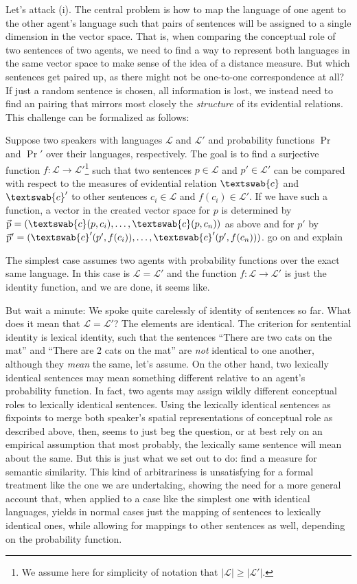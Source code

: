 \documentclass[11pt, a4paper]{scrartcl}
\renewcommand{\i}[1]{\emph{#1}}
\renewcommand{\L}{\mathcal{L}}
\renewcommand{\v}[1]{\vec{\mathrm{#1}}}
\newcommand{\m}[1]{\textswab{#1}}
\begin{document}
Let's attack (i). The central problem is how to map the language of one agent to the other agent's language such that pairs of sentences will be assigned to a single dimension in the vector space. That is, when comparing the conceptual role of two sentences of two agents, we need to find a way to represent both languages in the same vector space to make sense of the idea of a distance measure. But which sentences get paired up, as there might not be one-to-one correspondence at all? If just a random sentence is chosen, all information is lost, we instead need to find an pairing that mirrors most closely the \i{structure} of its evidential relations. This challenge can be formalized as follows:

Suppose two speakers with languages $\L$ and $\L'$ and probability functions $\Pr$ and $\Pr'$ over their languages, respectively. The goal is to find a surjective function ${f: \L \rightarrow \L'}$\footnote{We assume here for simplicity of notation that $|\L| \geqslant |\L'|$.} such that two sentences $p \in \L$ and $p' \in \L'$ can be compared with respect to the measures of evidential relation $\m{c}$ and $\m{c}'$ to other sentences $c_i \in \L$ and $f(c_i) \in \L'$. If we have such a function, a vector in the created vector space for $p$ is determined by $\v{p} = (\m{c}(p,c_i),\ldots,\m{c}(p,c_n))$ as above and for $p'$ by $\v{p}' = (\m{c}'(p',f(c_i)),\ldots,\m{c}'(p',f(c_n)))$. {\color{red} go on and explain} 

The simplest case assumes two agents with probability functions over the exact same language. In this case is $\L = \L'$ and the function $f: \L \rightarrow \L'$ is just the identity function, and we are done, it seems like.

But wait a minute: We spoke quite carelessly of identity of sentences so far. What does it mean that $\L = \L'$? The elements are identical. The criterion for sentential identity is lexical identity, such that the sentences ``There are two cats on the mat'' and ``There are 2 cats on the mat'' are \i{not} identical to one another, although they \i{mean} the same, let's assume. On the other hand, two lexically identical sentences may mean something different relative to an agent's probability function. In fact, two agents may assign wildly different conceptual roles to lexically identical sentences. Using the lexically identical sentences as fixpoints to merge both speaker's spatial representations of conceptual role as described above, then, seems to just beg the question, or at best rely on an empirical assumption that most probably, the lexically same sentence will mean about the same. But this is just what we set out to do: find a measure for semantic similarity. This kind of arbitrariness is unsatisfying for a formal treatment like the one we are undertaking, showing the need for a more general account that, when applied to a case like the simplest one with identical languages, yields in normal cases just the mapping of sentences to lexically identical ones, while allowing for mappings to other sentences as well, depending on the probability function. 
\end{document}
